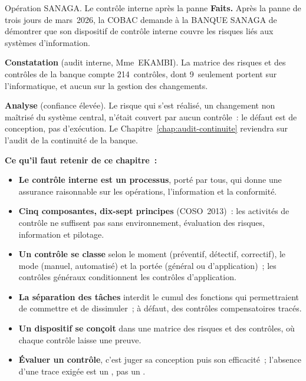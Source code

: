\begin{boxscenario}{Opération SANAGA. Le contrôle interne après la panne}
\textbf{Faits.} Après la panne de trois jours de mars~2026, la COBAC demande
à la BANQUE SANAGA de démontrer que son dispositif de contrôle interne
couvre les risques liés aux systèmes d'information.

\medskip
\textbf{Constatation} (audit interne, Mme~EKAMBI). La matrice des risques
et des contrôles de la banque compte 214~contrôles, dont 9~seulement portent
sur l'informatique, et aucun sur la gestion des changements.

\medskip
\textbf{Analyse} (confiance élevée). Le risque qui s'est réalisé, un
changement non maîtrisé du système central, n'était couvert par aucun
contrôle~: le défaut est de conception, pas d'exécution. Le
Chapitre~\ref{chap:audit-continuite} reviendra sur l'audit de la continuité
de la banque.
\end{boxscenario}

\separateur

\begin{boxresume}
\textbf{Ce qu'il faut retenir de ce chapitre~:}
\begin{itemize}
    \item \textbf{Le contrôle interne est un processus}, porté par tous,
          qui donne une assurance raisonnable sur les opérations,
          l'information et la conformité.
    \item \textbf{Cinq composantes, dix-sept principes} (COSO~2013)~: les
          activités de contrôle ne suffisent pas sans environnement,
          évaluation des risques, information et pilotage.
    \item \textbf{Un contrôle se classe} selon le moment (préventif,
          détectif, correctif), le mode (manuel, automatisé) et la portée
          (général ou d'application)~; les contrôles généraux conditionnent
          les contrôles d'application.
    \item \textbf{La séparation des tâches} interdit le cumul des fonctions
          qui permettraient de commettre et de dissimuler~; à défaut, des
          contrôles compensatoires tracés.
    \item \textbf{Un dispositif se conçoit} dans une matrice des risques et
          des contrôles, où chaque contrôle laisse une preuve.
    \item \textbf{Évaluer un contrôle}, c'est juger sa conception puis son
          efficacité~; l'absence d'une trace exigée est un \NON{}, pas un
          \NEK{}.
\end{itemize}
\end{boxresume}

